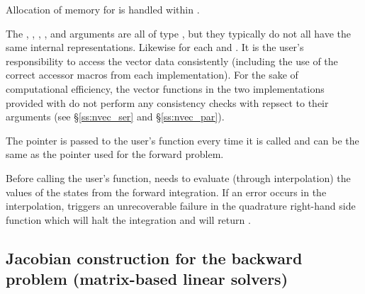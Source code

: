 {
  Allocation of memory for  is handled within {\idas}.

  The , , , , and  arguments are all
  of type , but they typically do not all have the same internal
  representations.  Likewise for each  and .  It is the user's
  responsibility to access the vector data consistently (including the use of the
  correct accessor macros from each {\nvector} implementation). For the sake of
  computational efficiency, the vector functions in the two {\nvector} implementations
  provided with {\idas} do not perform any consistency checks with repsect to their
   arguments (see \S\ref{ss:nvec_ser} and \S\ref{ss:nvec_par}).

  The  pointer is passed to the user's  function every time
  it is called and can be the same as the  pointer used for the forward
  problem.

  {\warn}Before calling the user's  function, {\idas} needs to evaluate
  (through interpolation) the values of the states from the forward integration.
  If an error occurs in the interpolation, {\idas} triggers an unrecoverable
  failure in the quadrature right-hand side function which will halt the integration and
   will return .
}


\subsection{Jacobian construction for the backward problem
  (matrix-based linear solvers)}\label{ss:jacFn_b}

